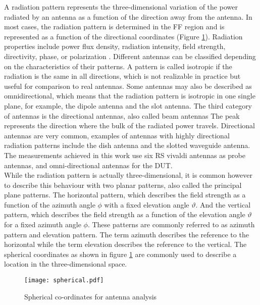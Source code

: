 A radiation pattern represents the three-dimensional variation of the power radiated by an antenna as a function of the direction away from the antenna. In most cases, the radiation pattern is determined in the \acs{FF} region and is represented as a function of the directional coordinates (Figure \ref{spherical}). Radiation properties include power flux density, radiation intensity, field strength, directivity, phase, or polarization \cite{balanis}. Different antennas can be classified depending on the characteristics of their patterns. A pattern is called isotropic if the radiation is the same in all directions, which is not realizable in practice but useful for comparison to real antennas. Some antennas may also be described as omnidirectional, which means that the radiation pattern is isotropic in one single plane, for example, the dipole antenna and the slot antenna. The third category of antennas is the directional antennas, also called beam antennas The peak represents the direction where the bulk of the radiated power travels. Directional antennas are very common, examples of antennas with highly directional radiation patterns include the dish antenna and the slotted waveguide antenna. The measurements achieved in this work use six \acs{RS}\textregistered{} vivaldi antennas as probe antennas, and omni-directional antennas for the \acs{DUT}. \\

While the radiation pattern is actually three-dimensional, it is common however to describe this behaviour with two planar patterns, also called the principal plane patterns. The horizontal pattern, which describes the field strength as a function of the azimuth angle $\phi$  with a fixed elevation angle $ \vartheta$. And the vertical pattern, which describes the field strength as a function of the elevation angle $\vartheta$  for a fixed azimuth angle $\phi$. These patterns are commonly referred to as azimuth pattern and elevation pattern. The term azimuth describes the reference to the horizontal while the term elevation describes the reference to the vertical. The spherical coordinates as shown in figure \ref{spherical} are commonly used to describe a location in the three-dimensional space.

\begin{figure}[H]
	\begin{center}
	\vspace{-1cm}
		\texttt{[image: spherical.pdf]}
			\vspace{-1cm} 	\caption{\label{spherical}Spherical co-ordinates for antenna analysis \cite{balanis}}
	\end{center}
\end{figure}

